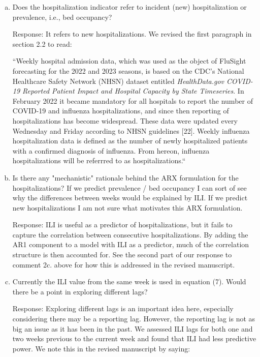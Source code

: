 \documentclass{article}
\newcommand{\spencer}[1]{{\color{red} Response: #1}}
\begin{document}
\begin{enumerate}[1.]
\begin{enumerate}[a.]
\item Does the hospitalization indicator refer to incident (new) hospitalization or prevalence, i.e.,
bed occupancy?

\spencer{It refers to new hospitalizations. 
We revised the first paragraph in section 2.2 to read:

``Weekly hospital admission data, which was used as the object of FluSight 
forecasting for the 
2022 and 2023 seasons, is based on the CDC's National Healthcare Safety 
Network (NHSN) dataset entitled \textit{HealthData.gov COVID-19 Reported 
Patient Impact and Hospital Capacity by State Timeseries}. 
In February 2022 it became mandatory for 
all hospitals to report the number of COVID-19 and influenza hospitalizations, 
and since then reporting of hospitalizations has become widespread. These data 
were updated every Wednesday and Friday according to NHSN guidelines 
[22]. Weekly influenza hospitalization data is
defined as the number of newly hospitalized patients with a confirmed diagnosis 
of influenza. From hereon, influenza hospitalizations
will be referrred to as hospitalizations.``}



\item Is there any "mechanistic" rationale behind the ARX formulation for the hospitalizations? If we
predict prevalence / bed occupancy I can sort of see why the differences between weeks would be
explained by ILI. If we predict new hospitalizations I am not sure what motivates this ARX
formulation.

\spencer{ILI is useful as a predictor of hospitalizations, but it fails to 
capture the correlation between consecutive hospitalizations. By adding the 
AR1 component to a model with ILI as a predictor, much of the correlation
structure is then accounted for. 
See the second part of our response to comment 2c. above for how this is 
addressed in the revised manuscript.}

\item Currently the ILI value from the same week is used in equation (7). Would there be a point in
exploring different lags?


\spencer{Exploring different lags is an important idea here, especially considering there
may be a reporting lag. However, the reporting lag is not as big an issue as it has
been in the past. We assessed ILI lags for both one and two weeks previous to the current
week and found that ILI had less predictive power. We note this in the
revised manuscript by saying:

}
\end{enumerate}
\end{enumerate}
\end{document}
